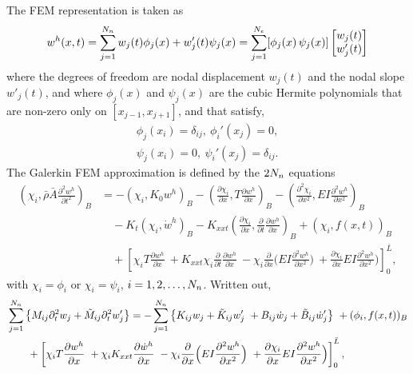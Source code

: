 \documentclass[11pt]{article}
\newcommand{\rhos}{\bar{\rho}}
\newcommand{\As}{\bar{A}}
\newcommand{\Ls}{\bar{L}}
\newcommand{\wt}{\dot{w}}
\begin{document}
The FEM representation is taken as 
\begin{align}
  w^h(x,t) = \sum_{j=1}^{N_n} w_j(t) \phi_j(x) + w_j'(t) \psi_j(x)  = \sum_{j=1}^{N_e} [ \phi_j(x)\, \psi_j(x)] \begin{bmatrix} w_j(t)\\w_j'(t)\end{bmatrix}
\end{align}
where the degrees of freedom are nodal displacement $w_j(t)$ and the nodal slope $w'_j(t)$, and where $\phi_j(x)$ and $\psi_j(x)$ are 
the cubic Hermite polynomials 
that are non-zero only on $[x_{j-1},x_{j+1}]$,  and
that satisfy,
\begin{align}
  \phi_j(x_i)=\delta_{ij}, ~ \phi_i'(x_j)=0, \\
  \psi_j(x_i)=0, ~ \psi_i'(x_j)=\delta_{ij}.
\end{align}
% 
The Galerkin FEM approximation is defined by the $2N_n$ equations
\begin{align}
 \left( \chi_i,  \rhos \As \frac{\partial^2 w^h}{\partial t^2} \right)_B  &= 
                  - \left( \chi_i , K_0 w^h \right)_B
                  - \left( \frac{\partial \chi_i}{\partial x} , T \frac{\partial w^h}{\partial x} \right)_B
                  -\left(\frac{\partial^2 \chi_i}{\partial x^2}, E I \frac{\partial^2 w^h}{\partial x^2}\right)_B  \\
              &\quad   
         - K_{t} \left( \chi_i , \wt^h \right)_B
         - K_{xxt} \left( \frac{\partial \chi_i}{\partial x} , \frac{\partial}{\partial t}\frac{\partial w^h}{\partial x} \right)_B
         + ( \chi_i, f(x,t))_B \\
             &\quad  +   \left[ \chi_i T \frac{\partial w^h}{\partial x} 
                      ~ + K_{xxt} \chi_i \frac{\partial}{\partial t}\frac{\partial w^h}{\partial x} 
                      ~ -\chi_i \frac{\partial}{\partial x}\Big( E I \frac{\partial^2 w^h}{\partial x^2}\Big) 
                      ~ + \frac{\partial \chi_i}{\partial x}E I \frac{\partial^2 w^h}{\partial x^2}\Big)  
                      \right]_0^{\Ls} ,  \label{eq:beamFEM_I}
\end{align}
with $\chi_i=\phi_i$ or $\chi_i=\psi_i$, $i=1,2,\ldots,N_n$. Written out,
\begin{align}
& \sum_{j=1}^{\Nn} \left\{ M_{ij} \partial_t^2 w_j 
                + \Mt_{ij} \partial_t^2 w'_j \right\}  = 
     - \sum_{j=1}^{\Nn} \left\{  K_{ij} w_j + \Kt_{ij} w'_j 
            ~ + B_{ij} \dot w_j + \Bt_{ij} \dot w'_j \right\} 
                  ~+ ( \phi_i, f(x,t))_B \\
             &\qquad  +   \left[ \chi_i T \frac{\partial w^h}{\partial x} 
                      ~ + \chi_i K_{xxt} \frac{\partial \dot w^h}{\partial x} 
                      ~ - \chi_i \frac{\partial}{\partial x}\Big( E I \frac{\partial^2 w^h}{\partial x^2}\Big) 
                      ~ + \frac{\partial \chi_i}{\partial x}E I \frac{\partial^2 w^h}{\partial x^2}\Big)  
                      \right]_0^{\Ls}  ,  \label{eq:beamFEM_II}
\end{align}
\end{document}
